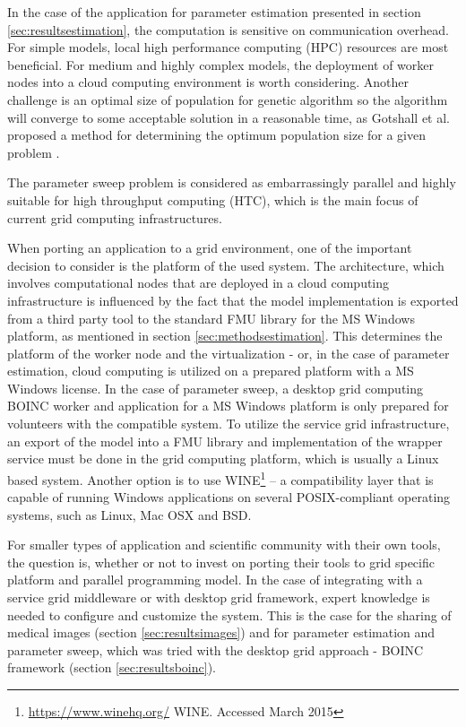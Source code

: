 In the case of the application for parameter estimation presented in section \ref{sec:resultsestimation}, the computation is sensitive on communication overhead. For simple models, local high performance computing (HPC) resources are most beneficial. For medium and highly complex models, the deployment of worker nodes into a cloud computing environment is worth considering. Another challenge is an optimal size of population for genetic algorithm so the algorithm will converge to some acceptable solution in a reasonable time, as Gotshall et al. proposed a method for determining the optimum population size for a given problem \cite{Gotshall2000}.

The parameter sweep problem is considered as embarrassingly parallel and highly suitable for high throughput computing (HTC), which is the main focus of current grid computing infrastructures. 



When porting an application to a grid environment, one of the important decision to consider is the platform of the used system. The architecture, which involves computational nodes that are deployed in a cloud computing infrastructure is influenced by the fact that the model implementation is exported from a third party tool to the standard FMU library for the MS Windows platform, as mentioned in section \ref{sec:methodsestimation}. This determines the platform of the worker node and the virtualization - or, in the case of parameter estimation, cloud computing is utilized on a prepared platform with a MS Windows license. In the case of parameter sweep, a desktop grid computing BOINC worker and application for a MS Windows platform is only prepared for volunteers with the compatible system. To utilize the service grid infrastructure, an export of the model into a FMU library and implementation of the wrapper service must be done in the grid computing platform,  which is usually a Linux based system. Another option is to use WINE\footnote{\url{https://www.winehq.org/} WINE. Accessed March 2015} -- a compatibility layer that is capable of running Windows applications on several POSIX-compliant operating systems, such as Linux, Mac OSX and BSD. 


For smaller types of application and scientific community with their own tools, the question is, whether or not to invest on porting their tools to grid specific platform and parallel programming model. 
In the case of integrating with a service grid middleware or with desktop grid framework, expert knowledge is needed to configure and customize the system. This is the case for the sharing of medical images (section \ref{sec:resultsimages}) and for parameter estimation and parameter sweep, which was tried with the desktop grid approach - BOINC framework (section \ref{sec:resultsboinc}).

